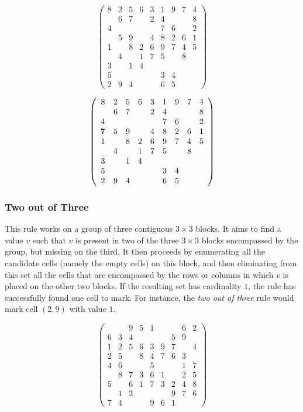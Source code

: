 \documentclass{article}
\begin{document}
\[ \left( \begin{array}{ccccccccc}
8 & 2 & 5 & 6 & 3 & 1 & 9 & 7 & 4 \\
  & 6 & 7 &   & 2 & 4 &   &   & 8 \\
4 &   &   &   &   & 7 & 6 &   & 2 \\
  & 5 & 9 &   & 4 & 8 & 2 & 6 & 1 \\
1 &   & 8 & 2 & 6 & 9 & 7 & 4 & 5 \\
  & 4 &   & 1 & 7 & 5 &   & 8 &   \\
3 &   & 1 & 4 &   &   &   &   &   \\
5 &   &   &   &   & 3 & 4 &   &   \\
2 & 9 & 4 &   &   & 6 & 5 &   &   \end{array}  \right)\]

\[ \left( \begin{array}{ccccccccc}
8 & 2 & 5 & 6 & 3 & 1 & 9 & 7 & 4 \\
  & 6 & 7 &   & 2 & 4 &   &   & 8 \\
4 &   &   &   &   & 7 & 6 &   & 2 \\
{\bf 7} & 5 & 9 &   & 4 & 8 & 2 & 6 & 1 \\
1 &   & 8 & 2 & 6 & 9 & 7 & 4 & 5 \\
  & 4 &   & 1 & 7 & 5 &   & 8 &   \\
3 &   & 1 & 4 &   &   &   &   &   \\
5 &   &   &   &   & 3 & 4 &   &   \\
2 & 9 & 4 &   &   & 6 & 5 &   &   \end{array}  \right)\]

\subsubsection{Two out of Three}

This rule works on a group of three contiguous $3 \times 3$ blocks. It aims to find a value $v$ such that $v$ is present in two of the three $3 \times 3$ blocks encompassed by the group, but missing on the third. It then proceeds by enumerating all the candidate cells (namely the empty cells) on this block, and then eliminating from this set all the cells that are encompassed by the rows or columns in which $v$ is placed on the other two blocks. If the resulting set has cardinality $1$, the rule has successfully found one cell to mark. For instance, the {\em two out of three} rule would mark cell $(2,9)$ with value $1$.

\[ \left( \begin{array}{ccccccccc}
  &   & 9 & 5 & 1 &   &   & 6 & 2 \\
6 & 3 & 4 &   &   &   & 5 & 9 &   \\
1 & 2 & 5 & 6 & 3 & 9 & 7 &   & 4 \\
2 & 5 &   & 8 & 4 & 7 & 6 & 3 &   \\
4 & 6 &   &   & 5 &   &   & 1 & 7 \\
  & 8 & 7 & 3 & 6 & 1 &   & 2 & 5 \\
5 &   & 6 & 1 & 7 & 3 & 2 & 4 & 8 \\
  & 1 & 2 &   &   &   & 9 & 7 & 6 \\
7 & 4 &   &   & 9 & 6 & 1 &   &   \end{array}  \right)\]
\end{document}
